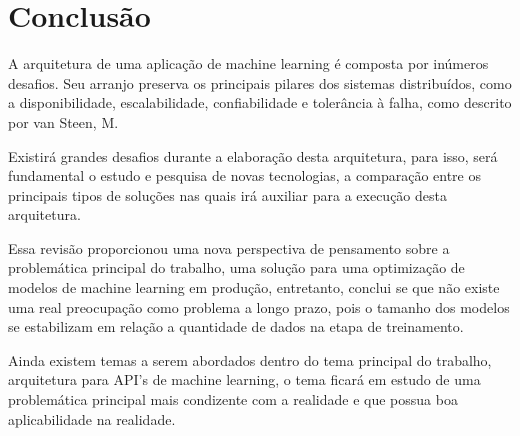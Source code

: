 \chapter{\textbf{Conclusão}} %
A arquitetura de uma aplicação de machine learning é composta por inúmeros desafios. Seu arranjo preserva os principais pilares dos sistemas distribuídos, como a disponibilidade, escalabilidade, confiabilidade e tolerância à falha, como descrito por van Steen, M.\par
Existirá grandes desafios durante a elaboração desta arquitetura, para isso, será fundamental o estudo e pesquisa de novas tecnologias, a comparação entre os principais tipos de soluções  nas quais irá auxiliar para a execução desta arquitetura.\par
Essa revisão proporcionou uma nova perspectiva de pensamento sobre a problemática principal do trabalho, uma solução para uma optimização de modelos de machine learning em produção, entretanto, conclui se que não existe uma real preocupação como problema a longo prazo, pois o tamanho dos modelos se estabilizam em relação a quantidade de dados na etapa de treinamento.\par
Ainda existem temas a serem abordados dentro do tema principal do trabalho,  arquitetura para API's de machine learning, o tema ficará em estudo de uma problemática principal mais condizente com a realidade e que possua boa aplicabilidade na realidade.\par
